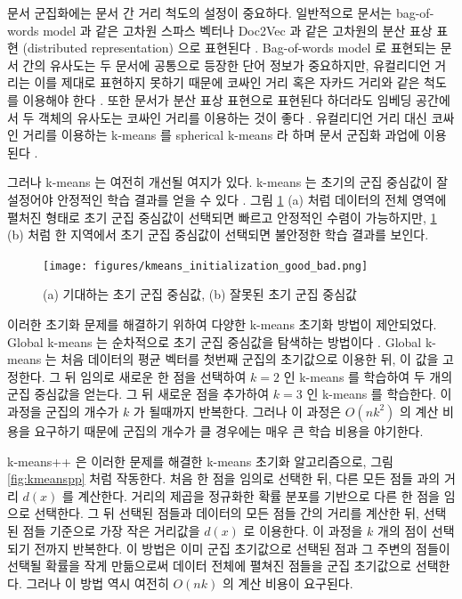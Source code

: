 \documentclass[11pt]{article}
\begin{document}
문서 군집화에는 문서 간 거리 척도의 설정이 중요하다.
일반적으로 문서는 bag-of-words model 과 같은 고차원 스파스 벡터나 Doc2Vec 과 같은 고차원의 분산 표상 표현 (distributed representation) 으로 표현된다 \citep{le2014distributed, dai2015document}.
Bag-of-words model 로 표현되는 문서 간의 유사도는 두 문서에 공통으로 등장한 단어 정보가 중요하지만, 유컬리디언 거리는 이를 제대로 표현하지 못하기 때문에 코싸인 거리 혹은 자카드 거리와 같은 척도를 이용해야 한다 \citep{huang2008similarity}.
또한 문서가 분산 표상 표현으로 표현된다 하더라도 임베딩 공간에서 두 객체의 유사도는 코싸인 거리를 이용하는 것이 좋다 \citep{levy2015improving}.
유컬리디언 거리 대신 코싸인 거리를 이용하는 k-means 를 spherical k-means 라 하며 문서 군집화 과업에 이용된다 \citep{dhillon2002iterative, buchta2012spherical}.

그러나 k-means 는 여전히 개선될 여지가 있다.
k-means 는 초기의 군집 중심값이 잘 설정어야 안정적인 학습 결과를 얻을 수 있다 \citep{arthur2007k}.
그림 \ref{fig:initialization_good_bad} (a) 처럼 데이터의 전체 영역에 펼처진 형태로 초기 군집 중심값이 선택되면 빠르고 안정적인 수렴이 가능하지만, \ref{fig:initialization_good_bad} (b) 처럼 한 지역에서 초기 군집 중심값이 선택되면 불안정한 학습 결과를 보인다.

\begin{figure}[H]
\centering
\texttt{[image: figures/kmeans\_initialization\_good\_bad.png]}
\caption{(a) 기대하는 초기 군집 중심값, (b) 잘못된 초기 군집 중심값}
\label{fig:initialization_good_bad}
\end{figure}

이러한 초기화 문제를 해결하기 위하여 다양한 k-means 초기화 방법이 제안되었다.
Global k-means 는 순차적으로 초기 군집 중심값을 탐색하는 방법이다 \citep{likas2003global, bagirov2008modified}.
Global k-means 는 처음 데이터의 평균 벡터를 첫번째 군집의 초기값으로 이용한 뒤, 이 값을 고정한다.
그 뒤 임의로 새로운 한 점을 선택하여 $k=2$ 인 k-means 를 학습하여 두 개의 군집 중심값을 얻는다.
그 뒤 새로운 점을 추가하여 $k=3$ 인 k-means 를 학습한다.
이 과정을 군집의 개수가 $k$ 가 될때까지 반복한다.
그러나 이 과정은 $O(nk^2)$ 의 계산 비용을 요구하기 때문에 군집의 개수가 클 경우에는 매우 큰 학습 비용을 야기한다.

k-means++ \citep{arthur2007k} 은 이러한 문제를 해결한 k-means 초기화 알고리즘으로, 그림 \ref{fig:kmeanspp} 처럼 작동한다.
처음 한 점을 임의로 선택한 뒤, 다른 모든 점들 과의 거리 $d(x)$ 를 계산한다.
거리의 제곱을 정규화한 확률 분포를 기반으로 다른 한 점을 임으로 선택한다.
그 뒤 선택된 점들과 데이터의 모든 점들 간의 거리를 계산한 뒤, 선택된 점들 기준으로 가장 작은 거리값을 $d(x)$ 로 이용한다.
이 과정을 $k$ 개의 점이 선택되기 전까지 반복한다.
이 방법은 이미 군집 초기값으로 선택된 점과 그 주변의 점들이 선택될 확률을 작게 만듦으로써 데이터 전체에 펼쳐진 점들을 군집 초기값으로 선택한다.
그러나 이 방법 역시 여전히 $O(nk)$ 의 계산 비용이 요구된다.
\end{document}

